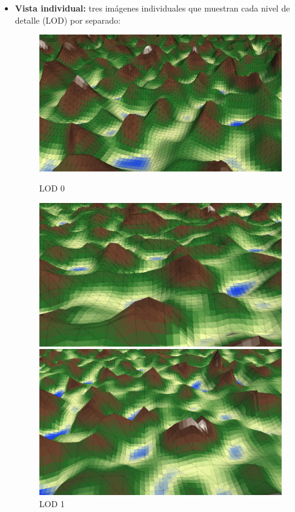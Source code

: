 \begin{itemize}
    \item \textbf{Vista individual: } tres imágenes individuales que muestran cada nivel de detalle (LOD) por separado:
    \begin{figure}[h]
        \begin{minipage}{0.3\textwidth}
            \centering
            \includegraphics[width=\textwidth]{img/codes/LOD0.png}
            \caption{LOD 0}
        \end{minipage}%
        \hfill
        \begin{minipage}{0.3\textwidth}
            \centering
            \includegraphics[width=\textwidth]{img/codes/LOD1.png}
            \caption{LOD 1}
        \end{minipage}
        \hfill
        \begin{minipage}{0.3\textwidth}
            \centering
            \includegraphics[width=\textwidth]{img/codes/LOD2.png}

\end{minipage}
\end{figure}
\end{itemize}
